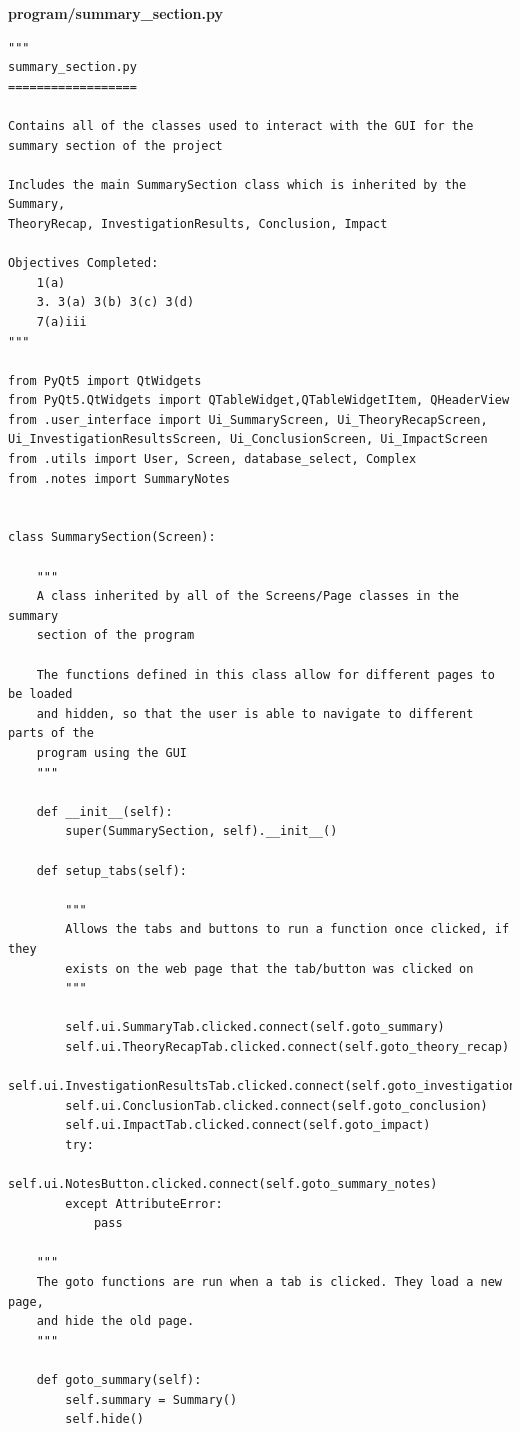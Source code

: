 \documentclass[12pt]{article}
\begin{document}
\textbf{program/summary\_section.py}
\begin{lstlisting}
"""
summary_section.py
==================

Contains all of the classes used to interact with the GUI for the
summary section of the project

Includes the main SummarySection class which is inherited by the Summary,
TheoryRecap, InvestigationResults, Conclusion, Impact

Objectives Completed:
    1(a)
    3. 3(a) 3(b) 3(c) 3(d)
    7(a)iii
"""

from PyQt5 import QtWidgets
from PyQt5.QtWidgets import QTableWidget,QTableWidgetItem, QHeaderView
from .user_interface import Ui_SummaryScreen, Ui_TheoryRecapScreen, Ui_InvestigationResultsScreen, Ui_ConclusionScreen, Ui_ImpactScreen
from .utils import User, Screen, database_select, Complex
from .notes import SummaryNotes


class SummarySection(Screen):

    """
    A class inherited by all of the Screens/Page classes in the summary
    section of the program

    The functions defined in this class allow for different pages to be loaded
    and hidden, so that the user is able to navigate to different parts of the
    program using the GUI
    """

    def __init__(self):
        super(SummarySection, self).__init__()

    def setup_tabs(self):

        """
        Allows the tabs and buttons to run a function once clicked, if they
        exists on the web page that the tab/button was clicked on
        """

        self.ui.SummaryTab.clicked.connect(self.goto_summary)
        self.ui.TheoryRecapTab.clicked.connect(self.goto_theory_recap)
        self.ui.InvestigationResultsTab.clicked.connect(self.goto_investigation_results)
        self.ui.ConclusionTab.clicked.connect(self.goto_conclusion)
        self.ui.ImpactTab.clicked.connect(self.goto_impact)
        try:
            self.ui.NotesButton.clicked.connect(self.goto_summary_notes)
        except AttributeError:
            pass

    """
    The goto functions are run when a tab is clicked. They load a new page,
    and hide the old page.
    """

    def goto_summary(self):
        self.summary = Summary()
        self.hide()


\end{lstlisting}
\end{document}
